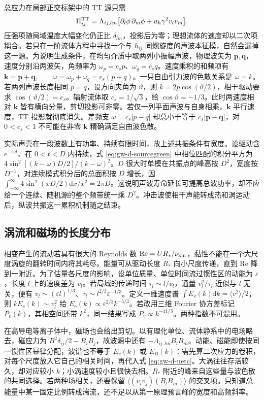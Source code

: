 总应力在局部正交标架中的 TT 源只需
\[
 \Pi_{ij}^{\rm TT}=\Lambda_{ij,lm}
 \big[\partial_l\phi\,\partial_m\phi
       +w_{\!h}\gamma^2 v_l v_m\big].
\]
压强项随局域温度大幅变化仍正比 $\delta_{lm}$，投影后为零；理想流体的速度却以二次项耦合。若只在一阶流体方程中寻找一个与 $h_{ij}$ 同螺旋度的声波本征模，自然会漏掉这一源。为说明生成条件，在均匀介质中取两列小振幅声波，物理波矢为 $\bm p,\bm q$，速度分别沿两波矢，角频率为 $\omega_p=c_s p$、$\omega_q=c_s q$。速度乘积的和频项有 $\bm k=\bm p+\bm q,\qquad \omega=\omega_p+\omega_q=c_s(p+q)$。一只自由引力波的色散关系是 $\omega=k$。若两列声波长度相同 $p=q$，设方向夹角为 $\vartheta$，则 $k=2p\cos(\vartheta/2)$，相干驱动要求 $\cos(\vartheta/2)=c_s$。辐射流体取 $c_s=1/\sqrt3$，给 $\cos\vartheta=-1/3$。此时两速度相对 $\bm k$ 皆有横向分量，剪切投影可非零。若仅一列平面声波与自身相乘，$\bm k$ 平行速度，TT 投影就彻底消失。差频支 $\omega=c_s|p-q|$ 却总小于等于 $c_s|\bm p-\bm q|$，对 $0<c_s<1$ 不可能在非零 $\bm k$ 精确满足自由波色散。

实际声壳在一段波数上有功率、持续有限时间，故上述共振条件有宽度。设驱动含 $e^{-\mathrm i\omega t}$、在 $0<t<D$ 内持续，式 \eqref{eq:gw-d-sourcegreen} 中相位匹配的积分平方为 $4\sin^2[(k-\omega)D/2]/(k-\omega)^2$。$D$ 很大时单模在共振点的峰高按 $D^2$，宽度按 $D^{-1}$，对连续模式积分后的总面积按 $D$ 增长，因 $\int_{-\infty}^\infty4\sin^2(x D/2)\mathrm dx/x^2=2\pi D$。这说明声波寿命延长可提高总波功率，却不应给一个连续、随机源的整个频带统一乘 $D^2$。冲击波使相干声能转成热和涡运动后，纵波共振这一累积机制随之结束。

\subsection{涡流和磁场的长度分布}

相变产生的流动若具有很大的 Reynolds 数 $\mathrm{Re}=U R_*/\nu_{\rm kin}$，黏性不能在一个大尺度涡旋的翻转时间内将其耗尽。能量可从驱动长度 $R_*$ 向小尺度传递，直到 $\mathrm{Re}$ 降到一附近。为了估量各尺度的影响，设单位质量、单位时间流过惯性区的动能为 $\varepsilon$，长度 $l$ 上的速度差为 $v_l$。若局域的传递时间 $\tau_l\sim l/v_l$，通量 $v_l^2/\tau_l$ 近似与 $l$ 无关，便有 $v_l\sim(\varepsilon l)^{1/3}$、$\tau_l\sim l^{2/3}\varepsilon^{-1/3}$。定义一维速度谱 $\int E_v(k)\mathrm dk=\langle v^2\rangle/2$，则 $kE_v(k)\sim v_l^2$ 给 $E_v(k)\propto\varepsilon^{2/3}k^{-5/3}$。若改用三维 Fourier 协方差标记 $P_v(k)$，其相空间还带 $k^2$，同一结果写成 $P_v\propto k^{-11/3}$。两种指数不可混用。

在高导电等离子体中，磁场也会给出剪切。以有理化单位、流体静系中的电场略去，磁应力为 $B^2\delta_{ij}/2-B_iB_j$，故波源中还有 $-\Lambda_{ij,lm}B_lB_m$。动能、磁能即使按同一惯性区幂律分配，波谱也不等于 $E_v(k)$ 或 $E_B(k)$：需先算二次应力的卷积，对每个尺度放入它自己的相关时间，再代入式 \eqref{eq:gw-d-uetc}。大涡往往存活较久，却对应较小 $k$；小涡速度较小且很快去相。$R_*$ 附近的峰来自这些量与波色散的共同选择。若两种场相关，还要保留 $\langle(v_iv_j)(B_lB_m)\rangle$ 的交叉项。只知道总能量中某一固定比例转成湍流，还不足以从第一原理预言峰的宽度和高频斜率。
